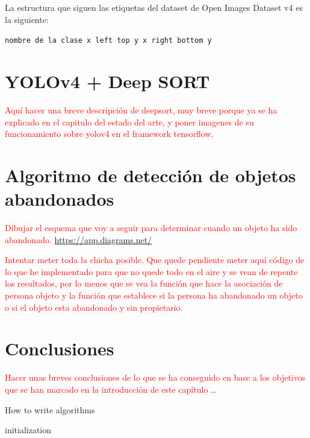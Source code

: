 La estructura que siguen las etiquetas del dataset de Open Images Dataset v4 es la siguiente:

\texttt{nombre de la clase x left top y x right bottom y}


\newpage

\section{YOLOv4 + Deep SORT}
\label{sec:desarrollo-yolov4+deepsort}

\textcolor{red}{Aquí hacer una breve descripción de deepsort, muy breve porque ya se ha explicado en el capitulo del estado del arte, y poner imagenes de su funcionamiento sobre yolov4 en el framework tensorflow}.

\newpage

\section{Algoritmo de detección de objetos abandonados}
\label{sec:algoritmo-object-detection}

\textcolor{red}{Dibujar el esquema que voy a seguir para determinar cuando un objeto ha sido abandonado.}
\url{https://app.diagrams.net/}

\textcolor{red}{Intentar meter toda la chicha posible. Que quede pendiente meter aquí código de lo que he implementado para que no quede todo en el aire y se vean de repente los resultados, por lo menos que se vea la función que hace la asociación de persona objeto y la función que establece si la persona ha abandonado un objeto o si el objeto esta abandonado y sin propietario.}

\newpage

\section{Conclusiones}
\label{sec:conclu-desarrollo}

\textcolor{red}{Hacer unas breves conclusiones de lo que se ha conseguido en base a los objetivos que se han marcado en la introducción de este capítulo \ldots}

\begin{algorithm}[H]
 \caption{How to write algorithms}
 \label{alg:howto}
 initialization\;
\end{algorithm}